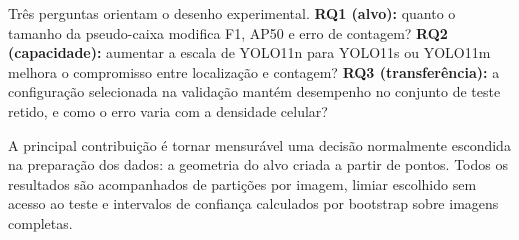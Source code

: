 Tr\^es perguntas orientam o desenho experimental. \textbf{RQ1 (alvo):} quanto o
tamanho da pseudo-caixa modifica F1, AP50 e erro de contagem?
\textbf{RQ2 (capacidade):} aumentar a escala de YOLO11n para YOLO11s ou YOLO11m
melhora o compromisso entre localiza\c{c}\~ao e contagem?
\textbf{RQ3 (transfer\^encia):} a configura\c{c}\~ao selecionada na valida\c{c}\~ao
mant\'em desempenho no conjunto de teste retido, e como o erro varia com a
densidade celular?

A principal contribui\c{c}\~ao \'e tornar mensur\'avel uma decis\~ao normalmente
escondida na prepara\c{c}\~ao dos dados: a geometria do alvo criada a partir de
pontos. Todos os resultados s\~ao acompanhados de parti\c{c}\~oes por imagem,
limiar escolhido sem acesso ao teste e intervalos de confian\c{c}a calculados por
bootstrap sobre imagens completas.
